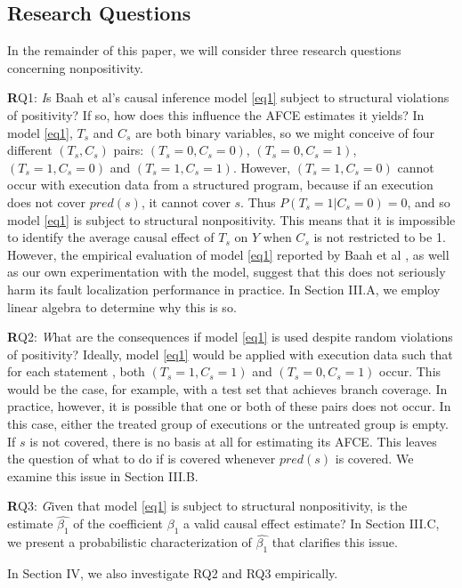 \subsection{Research Questions}\label{question}
In the remainder of this paper, we will consider three research questions concerning nonpositivity.

{\textbf RQ1}: {\textit Is Baah et al’s causal inference model \eqref{eq1} subject to structural violations of positivity?  If so, how does this influence the AFCE estimates it yields?} In model \eqref{eq1}, $T_s$ and $C_s$ are both binary variables, so we might conceive of four different $(T_s,C_s)$ pairs: $(T_s=0,C_s=0)$, $(T_s=0,C_s=1)$,  $(T_s=1,C_s=0)$ and $(T_s=1,C_s=1)$.  However, $(T_s=1,C_s=0)$ cannot occur with execution data from a structured program, because if an execution does not cover $pred(s)$, it cannot cover $s$.  Thus $P(T_s=1|C_s=0)=0$, and so model \eqref{eq1} is subject to structural nonpositivity.  This means that it is impossible to identify the average causal effect of $T_s$ on $Y$ when $C_s$ is not restricted to be 1.  However, the empirical evaluation of model \eqref{eq1} reported by Baah et al \cite{baah2010causal}, as well as our own experimentation with the model, suggest that this does not seriously harm its fault localization performance in practice.  In Section III.A, we employ linear algebra to determine why this is so.

{\textbf RQ2}: {\textit What are the consequences if model \eqref{eq1} is used despite random violations of positivity?}  Ideally, model \eqref{eq1} would be applied with execution data such that for each statement , both $(T_s=1,C_s=1)$ and $(T_s=0,C_s=1)$ occur.  This would be the case, for example, with a test set that achieves branch coverage.  In practice, however, it is possible that one or both of these pairs does not occur.  In this case, either the treated group of executions or the untreated group is empty.  If $s$ is not covered, there is no basis at all for estimating its AFCE.  This leaves the question of what to do if  is covered whenever $pred(s)$ is covered.  We examine this issue in Section III.B.

{\textbf RQ3}: {\textit Given that model \eqref{eq1} is subject to structural nonpositivity, is the estimate $\hat{\beta_1}$ of the coefficient $\beta_1$ a valid causal effect estimate?}  In Section III.C, we present a probabilistic characterization of $\hat{\beta_1}$ that clarifies this issue. 

In Section IV, we also investigate RQ2 and RQ3 empirically.

